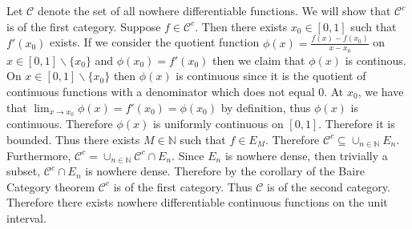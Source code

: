 \documentclass[12pt, letterpaper]{article}
\newcommand{\N}{\mathbb{N}}
\begin{document}
\begin{enumerate}
	Let $\mathcal{C}$ denote the set of all nowhere differentiable functions.  We will show that $\mathcal{C}^c$ is
	of the first category.  Suppose $f \in \mathcal{C}^c$.  Then there exists $x_0 \in [0,1]$ such that $f'(x_0)$ exists.
	If we consider the quotient function $\phi(x) = \frac{f(x) - f(x_0)}{x-x_0}$ on $x \in [0,1]\backslash \{x_0\}$ and
	$\phi(x_0) = f'(x_0)$ then we claim that $\phi(x)$ is continous.  On $x \in [0,1]\backslash \{x_0\}$ then $\phi(x)$
	is continuous since it is the quotient of continuous functions with a denominator which does not equal 0.  At $x_0$,
	we have that $\lim_{x \to x_0} \phi(x) = f'(x_0) = \phi(x_0)$ by definition, thus $\phi(x)$ is continuous.  Therefore $\phi(x)$
	is uniformly continuous on $[0,1]$.  Therefore it is bounded.  Thus there exists $M \in \N$ such that $f \in E_M$.
	Therefore $\mathcal{C}^c \subseteq \cup_{n \in \N} E_n$.  Furthermore, 
	$\mathcal{C}^c = \cup_{n \in \N} \mathcal{C}^c \cap E_n$.  Since $E_n$ is nowhere dense, then trivially a subset, 
	$\mathcal{C}^c \cap E_n$ is nowhere dense.  Therefore by the corollary of the Baire Category theorem $\mathcal{C}^c$
	is of the first category.  Thus $\mathcal{C}$ is of the second category.  Therefore there exists nowhere 
	differentiable continuous functions on the unit interval.  
	

\end{enumerate}
\end{document}
